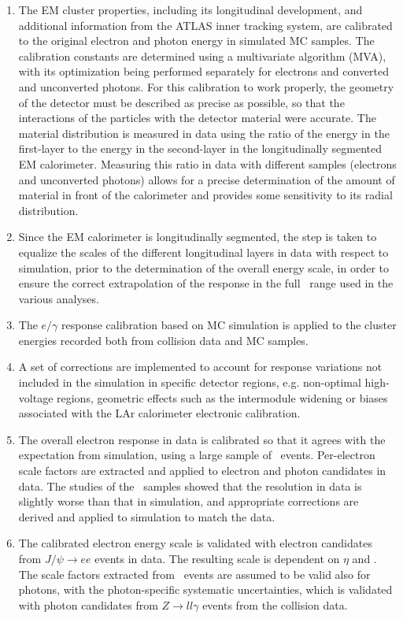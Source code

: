 \begin{enumerate}
\item The EM cluster properties, including its longitudinal development, and additional information from the ATLAS inner tracking system, are calibrated to the original electron and photon energy in simulated MC samples. The calibration constants are determined using a multivariate algorithm (MVA), with its optimization being performed separately for electrons and converted and unconverted photons. For this calibration to work properly, the geometry of the detector must be described as precise as possible, so that the interactions of the particles with the detector material were accurate. The material distribution is measured in data using the ratio of the energy in the first-layer to the energy in the second-layer in the longitudinally segmented EM calorimeter. Measuring this ratio in data with different samples (electrons and unconverted photons) allows for a precise determination of the amount of material in front of the calorimeter and provides some sensitivity to its radial distribution.
\item Since the EM calorimeter is longitudinally segmented, the step is taken to equalize the scales of the different longitudinal layers in data with respect to simulation, prior to the determination of the overall energy scale, in order to ensure the correct extrapolation of the response in the full \pt\ range used in the various analyses.
\item The $e/\gamma$ response calibration based on MC simulation is applied to the cluster energies recorded both from collision data and MC samples.
\item A set of corrections are implemented to account for response variations not included in the simulation in specific detector regions, e.g. non-optimal high-voltage regions, geometric effects such as the intermodule widening or biases associated with the LAr calorimeter electronic calibration.
\item The overall electron response in data is calibrated so that it agrees with the expectation from simulation, using a large sample of \Zee\ events. Per-electron scale factors are extracted and applied to electron and photon candidates in data. The studies of the \Zee\ samples showed that the resolution in data is slightly worse than
that in simulation, and appropriate corrections are derived and applied to simulation to match the data.
\item The calibrated electron energy scale is validated with electron candidates from $J/\psi \to ee$ events in data. The resulting scale is dependent on $\eta$ and \pt. The scale factors extracted from \Zee\ events are assumed to be valid also for photons, with the photon-specific systematic uncertainties, which is validated with photon candidates from $Z \to ll\gamma$ events from the collision data.
\end{enumerate}

